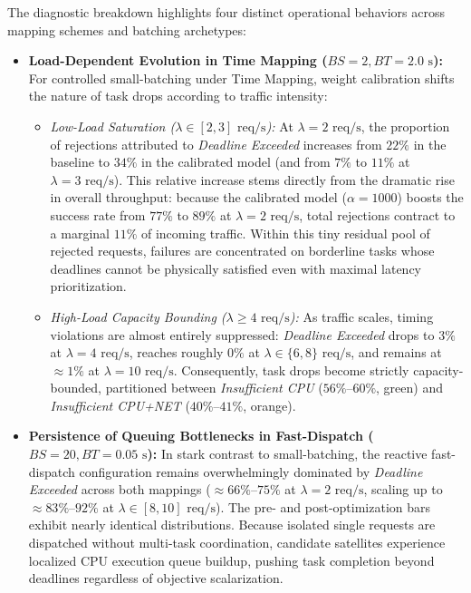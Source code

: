 The diagnostic breakdown highlights four distinct operational behaviors across mapping schemes and batching archetypes:
\begin{itemize}
    \item \textbf{Load-Dependent Evolution in Time Mapping ($BS=2, BT=2.0\text{ s}$):} 
    For controlled small-batching under Time Mapping, weight calibration shifts the nature of task drops according to traffic intensity:
    \begin{itemize}
        \item \textit{Low-Load Saturation ($\lambda \in [2, 3]\text{ req/s}$):} At $\lambda=2\text{ req/s}$, the proportion of rejections attributed to \textit{Deadline Exceeded} increases from $22\%$ in the baseline to $34\%$ in the calibrated model (and from $7\%$ to $11\%$ at $\lambda=3\text{ req/s}$). This relative increase stems directly from the dramatic rise in overall throughput: because the calibrated model ($\alpha=1000$) boosts the success rate from $77\%$ to $89\%$ at $\lambda=2\text{ req/s}$, total rejections contract to a marginal $11\%$ of incoming traffic. Within this tiny residual pool of rejected requests, failures are concentrated on borderline tasks whose deadlines cannot be physically satisfied even with maximal latency prioritization.
        \item \textit{High-Load Capacity Bounding ($\lambda \ge 4\text{ req/s}$):} As traffic scales, timing violations are almost entirely suppressed: \textit{Deadline Exceeded} drops to $3\%$ at $\lambda=4\text{ req/s}$, reaches roughly $0\%$ at $\lambda \in \{6, 8\}\text{ req/s}$, and remains at $\approx 1\%$ at $\lambda=10\text{ req/s}$. Consequently, task drops become strictly capacity-bounded, partitioned between \textit{Insufficient CPU} ($56\%\text{--}60\%$, green) and \textit{Insufficient CPU+NET} ($40\%\text{--}41\%$, orange).
    \end{itemize}

    \item \textbf{Persistence of Queuing Bottlenecks in Fast-Dispatch ($BS=20, BT=0.05\text{ s}$):} 
    In stark contrast to small-batching, the reactive fast-dispatch configuration remains overwhelmingly dominated by \textit{Deadline Exceeded} across both mappings ($\approx 66\%\text{--}75\%$ at $\lambda=2\text{ req/s}$, scaling up to $\approx 83\%\text{--}92\%$ at $\lambda \in [8, 10]\text{ req/s}$). The pre- and post-optimization bars exhibit nearly identical distributions. Because isolated single requests are dispatched without multi-task coordination, candidate satellites experience localized CPU execution queue buildup, pushing task completion beyond deadlines regardless of objective scalarization.
\end{itemize}
\FloatBarrier
